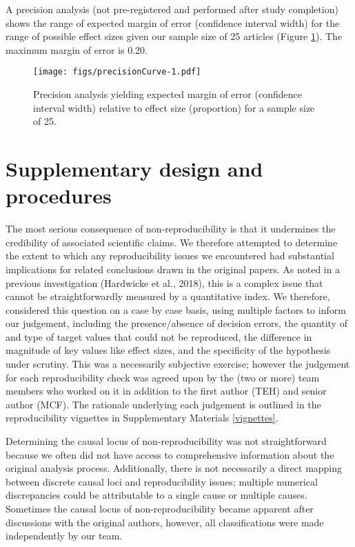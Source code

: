 \documentclass[english,,man,floatsintext]{apa6}
\begin{document}
\begin{appendix}
A precision analysis (not pre-registered and performed after study
completion) shows the range of expected margin of error (confidence
interval width) for the range of possible effect sizes given our sample
size of 25 articles (Figure \ref{fig:precisionCurve}). The maximum
margin of error is 0.20.

\begin{figure}
\centering
\texttt{[image: figs/precisionCurve-1.pdf]}
\caption{\label{fig:precisionCurve}Precision analysis yielding expected
margin of error (confidence interval width) relative to effect size
(proportion) for a sample size of 25.}
\end{figure}

\hypertarget{sup_design}{%
\section{Supplementary design and procedures}\label{sup_design}}

The most serious consequence of non-reproducibility is that it
undermines the credibility of associated scientific claims. We therefore
attempted to determine the extent to which any reproducibility issues we
encountered had substantial implications for related conclusions drawn
in the original papers. As noted in a previous investigation (Hardwicke
et al., 2018), this is a complex issue that cannot be straightforwardly
measured by a quantitative index. We therefore, considered this question
on a case by case basis, using multiple factors to inform our judgement,
including the presence/absence of decision errors, the quantity of and
type of target values that could not be reproduced, the difference in
magnitude of key values like effect sizes, and the specificity of the
hypothesis under scrutiny. This was a necessarily subjective exercise;
however the judgement for each reproducibility check was agreed upon by
the (two or more) team members who worked on it in addition to the first
author (TEH) and senior author (MCF). The rationale underlying each
judgement is outlined in the reproducibility vignettes in Supplementary
Materials \ref{vignettes}.

Determining the causal locus of non-reproducibility was not
straightforward because we often did not have access to comprehensive
information about the original analysis process. Additionally, there is
not necessarily a direct mapping between discrete causal loci and
reproducibility issues; multiple numerical discrepancies could be
attributable to a single cause or multiple causes. Sometimes the causal
locus of non-reproducibility became apparent after discussions with the
original authors, however, all classifications were made independently
by our team.


\end{appendix}
\end{document}

